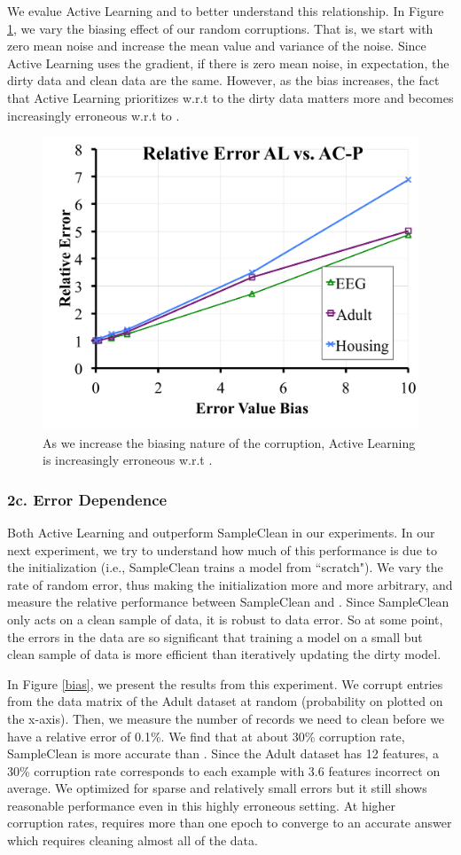 We evalue Active Learning and \sys to better understand this relationship.
In Figure \ref{albias}, we vary the biasing effect of our random corruptions.
That is, we start with zero mean noise and increase the mean value and variance of the noise.
Since Active Learning uses the gradient, if there is zero mean noise, in expectation, the dirty data and clean data are the same.
However, as the bias increases, the fact that Active Learning prioritizes w.r.t to the dirty data matters more and becomes increasingly erroneous w.r.t to \sys.

\begin{figure}[ht!]
\centering
 \includegraphics[width=0.6\columnwidth]{exp/exp10.pdf}
 \caption{As we increase the biasing nature of the corruption, Active Learning is increasingly erroneous w.r.t \sys. \label{albias}}
\end{figure}

\subsubsection{2c. Error Dependence}
Both Active Learning and \sys outperform SampleClean in our experiments.
In our next experiment, we try to understand how much of this performance 
is due to the initialization (i.e., SampleClean trains a model from ``scratch").
We vary the rate of random error, thus making the initialization more and more arbitrary, 
and measure the relative performance between SampleClean and \sys.
Since SampleClean only acts on a clean sample of data, it is robust to data error.
So at some point, the errors in the data are so significant that training a model on a small but clean sample of data is more efficient than iteratively updating the dirty model.

In Figure \ref{bias}, we present the results from this experiment.
We corrupt entries from the data matrix of the Adult dataset at random (probability on plotted on the x-axis).
Then, we measure the number of records we need to clean before we have a relative error of 0.1\%.
We find that at about 30\% corruption rate, SampleClean is more accurate than \sys.
Since the Adult dataset has 12 features, a 30\% corruption rate corresponds to each example with 3.6 features incorrect on average.
We optimized \sys for sparse and relatively small errors but it still shows reasonable performance even in this highly erroneous setting. 
At higher corruption rates, \sys requires more than one epoch to converge to an accurate answer which requires cleaning almost all of the data.

